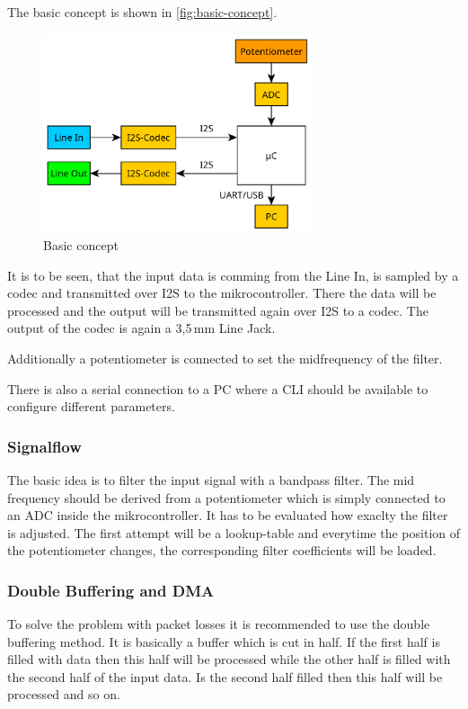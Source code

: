 The basic concept is shown in \autoref{fig:basic-concept}.

\begin{figure}[!h]
    \centering
    \includegraphics[width=8cm]{img/basic_concept.PNG}
    \caption{Basic concept}
    \label{fig:basic-concept}
\end{figure}

It is to be seen, that the input data is comming from the Line In, is sampled by a codec and transmitted
over \ac{I2S} to the mikrocontroller. There the data will be processed and the output will be transmitted
again over \ac{I2S} to a codec. The output of the codec is again a 3,5\,mm Line Jack.

Additionally a potentiometer is connected to set the midfrequency of the filter.

There is also a serial connection to a PC where a \ac{CLI} should be available to configure
different parameters.

\subsubsection{Signalflow}

The basic idea is to filter the input signal with a bandpass filter. The mid frequency should be derived
from a potentiometer which is simply connected to an \ac{ADC} inside the mikrocontroller. It has to be evaluated
how exaclty the filter is adjusted. The first attempt will be a lookup-table and everytime the position of the
potentiometer changes, the corresponding filter coefficients will be loaded.

\subsubsection{Double Buffering and DMA}

To solve the problem with packet losses it is recommended to use the double buffering method.
It is basically a buffer which is cut in half. If the first half is filled with data then this half
will be processed while the other half is filled with the second half of the input data. Is the second
half filled then this half will be processed and so on.

